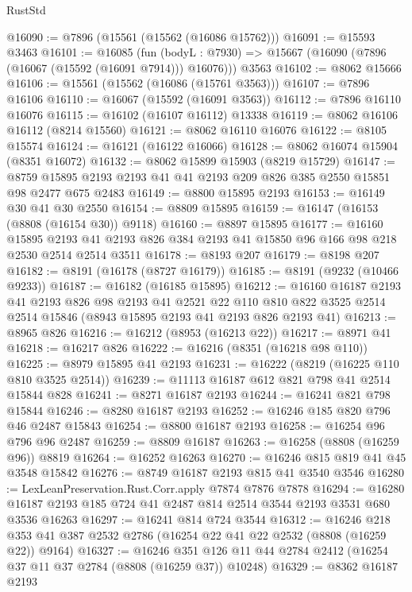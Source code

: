 \begin{lexlean}{RustStd}
\begin{coremodule}
@16090 := @7896 (@15561 (@15562 (@16086 @15762)))
@16091 := @15593 @3463
@16101 := @16085
    (fun (bodyL : @7930) => @15667 (@16090 (@7896 (@16067 (@15592 (@16091 @7914))) @16076)))
    @3563
@16102 := @8062 @15666
@16106 := @15561 (@15562 (@16086 (@15761 @3563)))
@16107 := @7896 @16106
@16110 := @16067 (@15592 (@16091 @3563))
@16112 := @7896 @16110 @16076
@16115 := @16102 (@16107 @16112) @13338
@16119 := @8062 @16106 @16112 (@8214 @15560)
@16121 := @8062 @16110 @16076
@16122 := @8105 @15574
@16124 := @16121 (@16122 @16066)
@16128 := @8062 @16074 @15904 (@8351 @16072)
@16132 := @8062 @15899 @15903 (@8219 @15729)
@16147 := @8759 @15895 @2193 @2193 @41 @41 @2193 @209 @826 @385 @2550 @15851 @98 @2477 @675 @2483
@16149 := @8800 @15895 @2193
@16153 := @16149 @30 @41 @30 @2550
@16154 := @8809 @15895
@16159 := @16147 (@16153 (@8808 (@16154 @30)) @9118)
@16160 := @8897 @15895
@16177 := @16160
    @15895
    @2193
    @41
    @2193
    @826
    @384
    @2193
    @41
    @15850
    @96
    @166
    @98
    @218
    @2530
    @2514
    @2514
    @3511
@16178 := @8193 @207
@16179 := @8198 @207
@16182 := @8191 (@16178 (@8727 @16179))
@16185 := @8191 (@9232 (@10466 @9233))
@16187 := @16182 (@16185 @15895)
@16212 := @16160
    @16187
    @2193
    @41
    @2193
    @826
    @98
    @2193
    @41
    @2521
    @22
    @110
    @810
    @822
    @3525
    @2514
    @2514
    @15846
    (@8943 @15895 @2193 @41 @2193 @826 @2193 @41)
@16213 := @8965 @826
@16216 := @16212 (@8953 (@16213 @22))
@16217 := @8971 @41
@16218 := @16217 @826
@16222 := @16216 (@8351 (@16218 @98 @110))
@16225 := @8979 @15895 @41 @2193
@16231 := @16222 (@8219 (@16225 @110 @810 @3525 @2514))
@16239 := @11113 @16187 @612 @821 @798 @41 @2514 @15844 @828
@16241 := @8271 @16187 @2193
@16244 := @16241 @821 @798 @15844
@16246 := @8280 @16187 @2193
@16252 := @16246 @185 @820 @796 @46 @2487 @15843
@16254 := @8800 @16187 @2193
@16258 := @16254 @96 @796 @96 @2487
@16259 := @8809 @16187
@16263 := @16258 (@8808 (@16259 @96)) @8819
@16264 := @16252 @16263
@16270 := @16246 @815 @819 @41 @45 @3548 @15842
@16276 := @8749 @16187 @2193 @815 @41 @3540 @3546
@16280 := LexLeanPreservation.Rust.Corr.apply @7874 @7876 @7878
@16294 := @16280 @16187 @2193 @185 @724 @41 @2487 @814 @2514 @3544 @2193 @3531 @680 @3536 @16263
@16297 := @16241 @814 @724 @3544
@16312 := @16246
    @218
    @353
    @41
    @387
    @2532
    @2786
    (@16254 @22 @41 @22 @2532 (@8808 (@16259 @22)) @9164)
@16327 := @16246
    @351
    @126
    @11
    @44
    @2784
    @2412
    (@16254 @37 @11 @37 @2784 (@8808 (@16259 @37)) @10248)
@16329 := @8362 @16187 @2193

\end{coremodule}
\end{lexlean}
